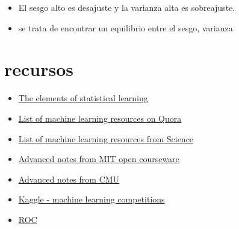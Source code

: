 \documentclass[
]{article}
\providecommand{\tightlist}{%
  \setlength{\itemsep}{0pt}\setlength{\parskip}{0pt}}
\begin{document}
\begin{itemize}
\tightlist
\item
  El sesgo alto es desajuste y la varianza alta es sobreajuste.
\item
  se trata de encontrar un equilibrio entre el sesgo, varianza
\end{itemize}

\hypertarget{recursos}{%
\section{recursos}\label{recursos}}

\begin{itemize}
\tightlist
\item
  \href{http://statweb.stanford.edu/~tibs/ElemStatLearn/}{The elements
  of statistical learning}
\item
  \href{http://www.quora.com/Machine-Learning/What-are-some-good-resources-for-learning-about-machine-learning-Why}{List
  of machine learning resources on Quora}
\item
  \href{http://www.sciencemag.org/site/feature/data/compsci/machine_learning.xhtml}{List
  of machine learning resources from Science}
\item
  \href{http://ocw.mit.edu/courses/electrical-engineering-and-computer-science/6-867-machine-learning-fall-2006/lecture-notes/}{Advanced
  notes from MIT open courseware}
\item
  \href{http://www.stat.cmu.edu/~cshalizi/350/}{Advanced notes from CMU}
\item
  \href{http://www.kaggle.com/}{Kaggle - machine learning competitions}
\item
  \href{http://en.wikipedia.org/wiki/Receiver_operating_characteristic}{ROC}
\end{itemize}
\end{document}
